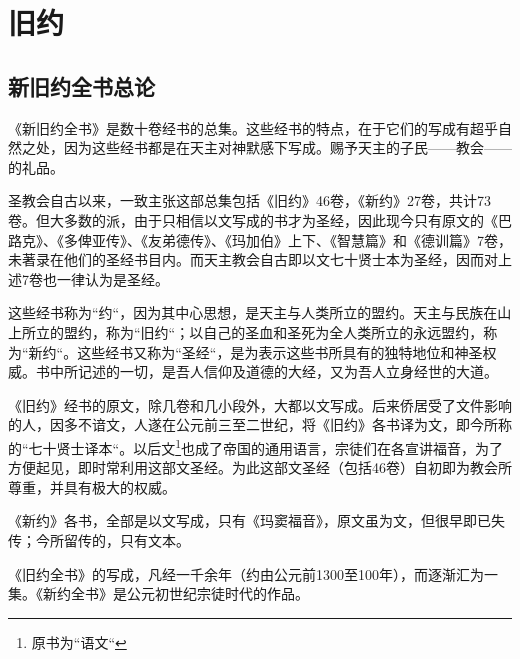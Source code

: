 \part{旧约}


\chapter*{新旧约全书总论}
《新旧约全书》是数十卷经书的总集。这些经书的特点，在于它们的写成有超乎自然之处，因为这些经书都是在天主对神默感下写成。赐予天主的子民——教会——的礼品。

圣教会自古以来，一致主张这部总集包括《旧约》46卷，《新约》27卷，共计73卷。但大多数的\UL[基督教]派，由于只相信以\UL[希伯来]文写成的书才为圣经，因此现今只有\UL[希腊]原文的《巴路克》、《多俾亚传》、《友弟德传》、《玛加伯》上下、《智慧篇》和《德训篇》7卷，未著录在他们的圣经书目内。而天主教会自古即以\UL[希腊]文七十贤士本为圣经，因而对上述7卷也一律认为是圣经。

这些经书称为“约“，因为其中心思想，是天主与人类所立的盟约。天主与\UL[以色列]民族在\UL[西乃]山上所立的盟约，称为“旧约“；\UL[耶稣]以自己的圣血和圣死为全人类所立的永远盟约，称为“新约“。这些经书又称为“圣经“，是为表示这些书所具有的独特地位和神圣权威。书中所记述的一切，是吾人信仰及道德的大经，又为吾人立身经世的大道。

《旧约》经书的原文，除几卷和几小段外，大都以\UL[希伯来]文写成。后来侨居\UL[北非]受了\UL[希腊]文件影响的\UL[犹太]人，因多不谙\UL[希伯来]文，\UL[犹太]人遂在公元前三至二世纪，将《旧约》各书译为\UL[希腊]文，即今所称的“七十贤士译本“。以后\UL[希腊]文\footnote[0]{原书为“语文“}也成了\UL[罗马]帝国的通用语言，宗徒们在各宣讲福音，为了方便起见，即时常利用这部\UL[希腊]文圣经。为此这部\UL[希腊]文圣经（包括46卷）自初即为教会所尊重，并具有极大的权威。

《新约》各书，全部是以\UL[希腊]文写成，只有《玛窦福音》，原文虽为\UL[阿辣美]文，但很早即已失传；今所留传的，只有\UL[希腊]文本。

《旧约全书》的写成，凡经一千余年（约由公元前1300至100年），而逐渐汇为一集。《新约全书》是公元初世纪宗徒时代的作品。

